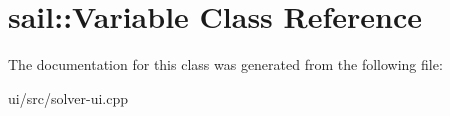 \hypertarget{classsail_1_1Variable}{\section{sail\-:\-:\-Variable \-Class \-Reference}
\label{classsail_1_1Variable}
}


\-The documentation for this class was generated from the following file\-:\begin{DoxyCompactItemize}
\item 
ui/src/solver-\/ui.\-cpp\end{DoxyCompactItemize}
